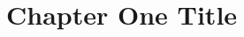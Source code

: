 \documentclass[../main.tex]{subfiles}
\begin{document}
	\cleardoublepage
	\chapter{Chapter One Title}
	
	\Blindtext
	
	
\end{document}
